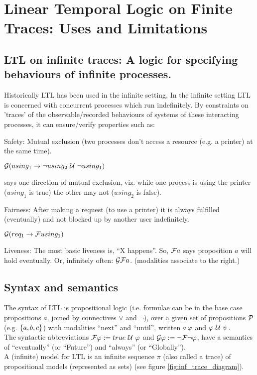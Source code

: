 
\section{Linear Temporal Logic on Finite Traces: Uses and Limitations}

\subsection{LTL on infinite traces: A logic for specifying behaviours of infinite processes.}
Historically LTL has been used in the infinite setting,
In the infinite setting LTL is concerned with concurrent processes which run indefinitely. By constraints on 'traces' of the observable/recorded behaviours of systems of these interacting processes, it can ensure/verify properties such as:

Safety:
Mutual exclusion (two processes don't access a resource
(e.g. a printer) at the same time).
\begin{center}
  $\mathcal{G}(using_1 \to \neg using_2 \ \mathcal{U}\  \neg using_1)$
\end{center}
says one direction of mutual exclusion,
viz. while one process is using the printer ($using_1$ is true)
the other may not ($using_2$ is false).

Fairness:
After making a request (to use a printer) it is always fulfilled (eventually)
and not blocked up by another user indefinitely.
\begin{center}
  $\mathcal{G}(req_1 \to \mathcal{F} using_1)$
\end{center}

Liveness:
The most basic liveness is, ``X happens''. So, $\mathcal{F} a$ says proposition $a$ will hold eventually.
Or, infinitely often: $\mathcal{G} \mathcal{F} a$. (modalities associate to the right.)
\subsection{Syntax and semantics}
The syntax of LTL is propositional logic
(i.e. formulae can be in the base case propositions $a$,
joined by connectives $\lor$ and $\neg$),
over a given set of propositions
$\mathcal{P}$ (e.g. $\{a,b,c\}$) with modalities ``next'' and ``until'', written
$\circ\, \varphi$ and $\varphi \ \mathcal{U}\  \psi$.
\\The syntactic abbreviations
$\mathcal{F} \varphi := true \ \mathcal{U}\  \varphi$ and
$\mathcal{G} \varphi := \neg \mathcal{F} \neg \varphi$,
have a semantics of ``eventually'' (or ``Future'')
and ``always'' (or ``Globally'').
\\A (infinite) model for LTL is an infinite sequence
$\pi$ (also called a trace) of propositional models (represented as sets) (see figure \ref{fig:inf_trace_diagram}).


